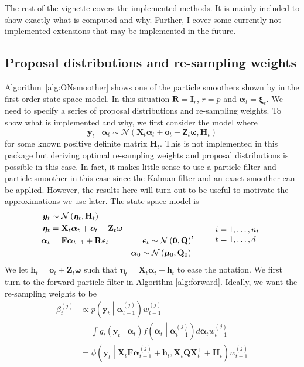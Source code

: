 \documentclass[notitlepage]{article}
\renewcommand{\vec}[1]{\bm{#1}}
\newcommand{\mat}[1]{\mathbf{#1}}
\newcommand{\Lparen}[1]{\left( #1\right)}
\newcommand{\Cond}[2]{ #1 \middle\vert  #2}
\newcommand{\optor}[2]{#1\Lparen{#2}}
\newcommand{\optorC}[3]{\optor{#1}{\Cond{#2}{#3}}}
\newcommand{\pdensC}[2]{\optorC{p}{#1}{#2}}
\newcommand{\normal}[2]{\optor{\mathcal{N}}{#1,#2}}
\newcommand{\normaldC}[3]{\optorC{\phi}{#1}{#2,#3}}
\newcommand{\partic}[3]{#1_{#2}^{\Lparen{#3}}}
\newcommand{\dimState}{p}
\newcommand{\dimRng}{r}
\begin{document}
The rest of the vignette covers the implemented methods. It is mainly included to show exactly what is 
computed and why. Further, I cover some currently not implemented extensions that may be implemented in the 
future. 


\subsection{Proposal distributions and re-sampling weights}
Algorithm~\ref{alg:ONsmoother} shows one of the particle smoothers shown by
\cite{fearnhead10} in the first order state space model. In this situation $\mat R = \mat I_\dimRng$,
$\dimRng = \dimState$ and $\vec\alpha_t = \vec\xi_t$. We need to specify a series of proposal distributions and 
re-sampling weights. To show what is implemented and why, we first 
consider the model where %
%
$$\vec y_t \mid \vec\alpha_t \sim \normal{%
	\mat{X}_t\vec{\alpha}_t + \vec{o}_t +  \mat{Z}_t\vec{\omega}}{\mat H_t}$$%
%
for some known positive definite matrix $\mat H_t$. This is not implemented 
in this package but deriving 
optimal re-sampling weights and proposal distributions is possible in this case. 
In fact, it makes little sense to use a particle filter and particle smoother in this case
since the Kalman filter and an exact smoother can be applied. However, the results here
will turn out to be useful to motivate the approximations we use
later. The state space model is%
%
$$\begin{aligned}
 	\vec y_t & \sim \normal{\vec\eta_t}{\mat H_t} &  \\
%
 	\vec{\eta}_{t} &= \mat{X}_t\vec{\alpha}_t + \vec{o}_t +   
 	\mat{Z}_t\vec\omega & \\
%
 	\vec{\alpha}_t &= \mat{F}\vec{\alpha}_{t - 1} + \mat{R}\vec{\epsilon}_t&
 		\vec{\epsilon}_t \sim \normal{\vec{0}}{\mat{Q}} \\
%
	& \vphantom{a} &	\vec{\alpha}_0 \sim \normal{\vec\mu_0}{\mat{Q}_0}
\end{aligned}, \qquad
%
\begin{array}{l} i = 1, \dots, n_t \\ t = 1, \dots, d \end{array}$$%
%
We let $\vec h_t = \vec{o}_t + \mat{Z}_t\vec\omega$ such that 
$\vec \eta_t = \mat X_t\vec \alpha_t + \vec h_t$ to ease the notation.  
We first turn to the forward particle filter in Algorithm \ref{alg:forward}. Ideally, we 
want the re-sampling weights to be 
%
\begin{align}\label{eq:fwReWeight}
\partic\beta tj &\propto \pdensC{\vec y_t}{\partic{\vec\alpha}{t-1}j}\partic w{t-1}j \\
	&=\int \optorC{g_t}{\vec y_t}{\vec\alpha_t}
		\optorC{f}{\vec\alpha_t}{\partic{\vec\alpha}{t-1}j}d\vec\alpha_t \partic w{t-1}j \nonumber\\
	&= \normaldC{\vec y_t }{\mat X_t\mat F\partic{\vec\alpha}{t-1}j + \vec h_t}{%
	\mat X_t \mat Q \mat X_t^\top + \mat H_t}
	\partic w{t-1}j\nonumber
\end{align}%
\end{document}
